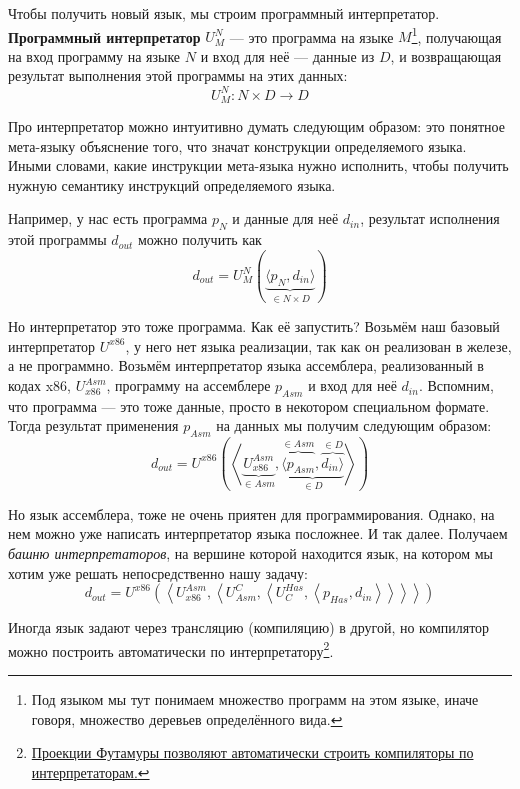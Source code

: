 \documentclass[12pt]{article}
\newcommand{\vocab}[1]{\textbf{#1}} %
\newcommand{\point}[1]{{\color{blue}\textit{#1}}} %
\begin{document}
    Чтобы получить новый язык, мы строим программный интерпретатор.
    \vocab{Программный интерпретатор} $U_M^N$ --- это программа на языке $M$\footnote{Под языком мы тут понимаем множество программ на этом языке, иначе говоря, множество деревьев определённого вида.}, получающая на вход программу на языке $N$ и вход для неё --- данные из $D$, и возвращающая результат выполнения этой программы на этих данных: \[U_M^N : N\times D\to D\]

    Про интерпретатор можно интуитивно думать следующим образом: это понятное мета-языку объяснение того, что значат конструкции определяемого языка.
    Иными словами, какие инструкции мета-языка нужно исполнить, чтобы получить нужную семантику инструкций определяемого языка.

    Например, у нас есть программа $p_N$ и данные для неё $d_{in}$, результат исполнения этой программы $d_{out}$ можно получить как \[d_{out} = U_M^N\left( \underbrace{\langle p_N, d_{in} \rangle}_{\in N\times D} \right)\]

    Но интерпретатор это тоже программа.
    Как её запустить?
    Возьмём наш базовый интерпретатор $U^{x86}$, у него нет языка реализации, так как он реализован в железе, а не программно.
    Возьмём интерпретатор языка ассемблера, реализованный в кодах x86, $U_{x86}^{Asm}$, программу на ассемблере $p_{Asm}$ и вход для неё $d_{in}$.
    Вспомним, что программа --- это тоже данные, просто в некотором специальном формате.
    Тогда результат применения $p_{Asm}$ на данных мы получим следующим образом:
    \[
        d_{out} = U^{x86}\left(\left<\underbrace{U_{x86}^{Asm}}_{\in Asm}, \underbrace{\overbrace{\langle p_{Asm}}^{\in Asm}, \overbrace{d_{in} \rangle}^{\in D}}_{\in D} \right>\right)
    \]

    Но язык ассемблера, тоже не очень приятен для программирования.
    Однако, на нем можно уже написать интерпретатор языка посложнее.
    И так далее.
    Получаем \point{башню интерпретаторов}, на вершине которой находится язык, на котором мы хотим уже решать непосредственно нашу задачу:
    \[
        d_{out} =
        U^{x86}\left(\left<
        U_{x86}^{Asm}, \left<
        U^C_{Asm}, \left<
        U^{Has}_C, \left< p_{Has}, d_{in}
        \right>\right>\right>\right>\right)
    \]

    Иногда язык задают через трансляцию (компиляцию) в другой, но компилятор можно построить автоматически по интерпретатору\footnote{\href{https://habr.com/ru/articles/47418/}{Проекции Футамуры позволяют автоматически строить компиляторы по интерпретаторам.}}.
\end{document}
